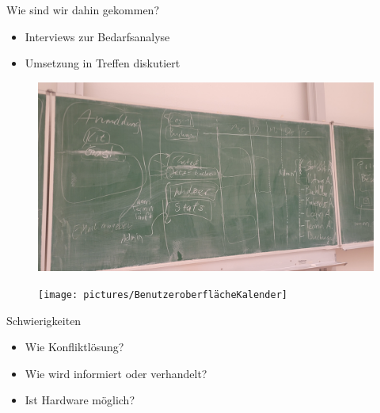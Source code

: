 \begin{frame}{Wie sind wir dahin gekommen?}
    \begin{itemize}
        \item Interviews zur Bedarfsanalyse
        \item Umsetzung in Treffen diskutiert
    \end{itemize}
\end{frame}

\begin{frame}[plain]
    \thispagestyle{plain}
    \begin{figure}
        \centering
        \includegraphics[width=1\linewidth]{pictures/BrainstormTafelbild}
        \label{fig: Tafelbild Brainstorm}
    \end{figure}
\end{frame}

\begin{frame}[plain]
    \thispagestyle{plain}
    \begin{figure}
        \centering
        \texttt{[image: pictures/BenutzeroberflächeKalender]}
        \label{fig: Mockup Übersicht}
    \end{figure}
\end{frame}

\begin{frame}{Schwierigkeiten}
    \begin{itemize}
        \item Wie Konfliktlösung?
        \item Wie wird informiert oder verhandelt?
        \item Ist Hardware möglich?
    \end{itemize}
\end{frame}
